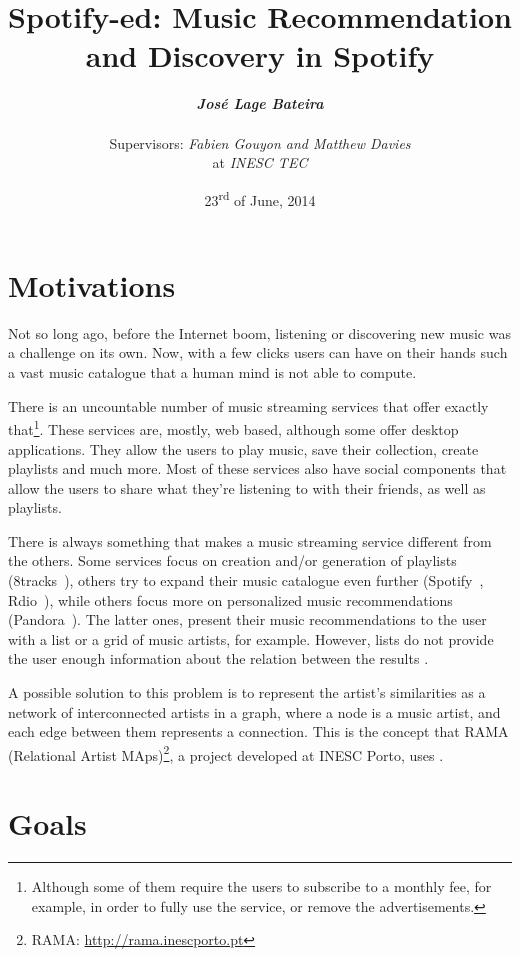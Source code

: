 \documentclass[twocolumn]{article}
\title{
  \huge
  \textbf{
    Spotify-ed: Music Recommendation and Discovery in Spotify
  }
}
\author{
  \large{\emph{\textbf{José Lage Bateira}}} \\ \\
  Supervisors: \emph{Fabien Gouyon and Matthew Davies}  \\
  at \emph{INESC TEC}
}
\date{23\textsuperscript{rd} of June, 2014}
\begin{document}
\maketitle

\thispagestyle{empty}

\section{Motivations}
\label{sec:motivations}

  Not so long ago, before the Internet boom, listening or discovering new music was a challenge on its own.
  Now, with a few clicks users can have on their hands such a vast music catalogue that a human mind is not able to compute.

  There is an uncountable number of music streaming services that offer exactly that\footnote{Although some of them require the users to subscribe to a monthly fee, for example, in order to fully use the service, or remove the advertisements.}.
  These services are, mostly, web based, although some offer desktop applications.
  They allow the users to play music, save their collection, create playlists and much more.
  Most of these services also have social components that allow the users to share what they're listening to with their friends, as well as playlists.

  There is always something that makes a music streaming service different from the others.
  Some services focus on creation and/or generation of playlists (8tracks~\cite{8tracks}), others try to expand their music catalogue even further (Spotify~\cite{spotify}, Rdio~\cite{rdio}), while others focus more on personalized music recommendations (Pandora~\cite{pandora}).
  The latter ones, present their music recommendations to the user with a list or a grid of music artists, for example.
  However, lists do not provide the user enough information about the relation between the results \cite{Lamere2008}.

  A possible solution to this problem is to represent the artist's similarities as a network of interconnected artists in a graph, where a node is a music artist, and each edge between them represents a connection.
  This is the concept that RAMA (Relational Artist MAps)\footnote{RAMA: \url{http://rama.inescporto.pt}}, a project developed at INESC Porto, uses \cite{Costa2008} \cite{Sarmento2009} \cite{Costa2009} \cite{Gouyon2011}.
  

\section{Goals}
\label{sec:goals}
\end{document}
